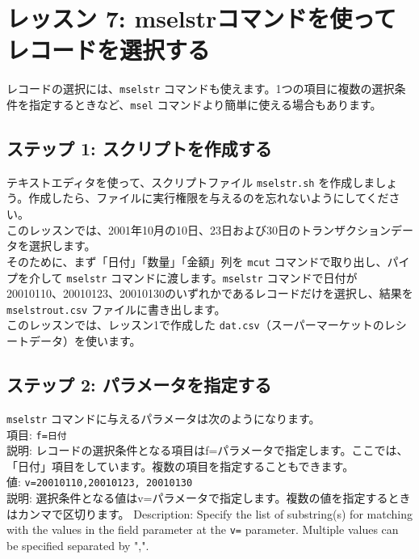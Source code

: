 

%

\section{レッスン 7: mselstrコマンドを使ってレコードを選択する}

レコードの選択には、\verb|mselstr| コマンドも使えます。1つの項目に複数の選択条件を指定するときなど、\verb|msel| コマンドより簡単に使える場合もあります。

\subsection{ステップ 1: スクリプトを作成する}

テキストエディタを使って、スクリプトファイル \verb|mselstr.sh| を作成しましょう。作成したら、ファイルに実行権限を与えるのを忘れないようにしてください。\\

このレッスンでは、2001年10月の10日、23日および30日のトランザクションデータを選択します。\\

そのために、まず「日付」「数量」「金額」列を \verb|mcut| コマンドで取り出し、パイプを介して \verb|mselstr| コマンドに渡します。\verb|mselstr| コマンドで日付が20010110、20010123、20010130のいずれかであるレコードだけを選択し、結果を \verb|mselstrout.csv| ファイルに書き出します。\\

このレッスンでは、レッスン1で作成した \verb|dat.csv|（スーパーマーケットのレシートデータ）を使います。

\subsection{ステップ 2: パラメータを指定する}

{\setlength{\parindent}{0cm}

\verb|mselstr| コマンドに与えるパラメータは次のようになります。\\

項目: 		\verb|f=日付| \\
説明: レコードの選択条件となる項目はf=パラメータで指定します。ここでは、「日付」項目をしています。複数の項目を指定することもできます。\\

値: 		\verb|v=20010110,20010123, 20010130 | \\
説明: 選択条件となる値はv=パラメータで指定します。複数の値を指定するときはカンマで区切ります。
Description: 	Specify the list of substring(s) for matching with the values in the field parameter at the \verb|v=| parameter. Multiple values can be specified separated by ",". 

}

